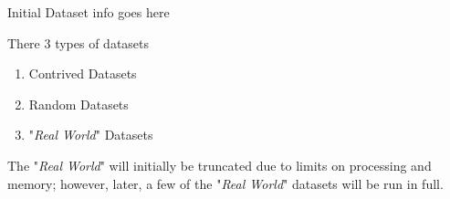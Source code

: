 \documentclass[../ClusteringConnectionsMAIN.tex]{subfiles}
\begin{document}
\begin{flushleft}
\begin{large}

Initial Dataset info goes here \newline

There 3 types of datasets

\begin{enumerate}
\item Contrived Datasets
\item Random Datasets
\item "\emph{Real World}" Datasets
\end{enumerate}

The "\emph{Real World}" will initially be truncated due to limits on processing and memory; however, later, a few of the "\emph{Real World}" datasets will be run in full.

\end{large}
\end{flushleft}
\end{document}
